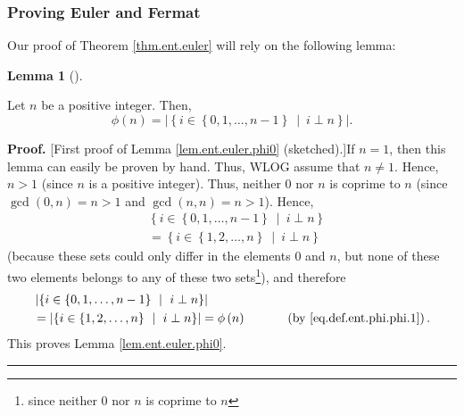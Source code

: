 \documentclass[numbers=enddot,12pt,final,onecolumn,notitlepage]{scrartcl}%
\numberwithin{exer}{subsection}
\theoremstyle{definition}
\newtheorem{lem}[theo]{Lemma}
\newenvironment{lemma}[1][]
{\begin{lem}[#1]\begin{leftbar}}
{\end{leftbar}\end{lem}}
\newenvironment{proof}[1][Proof]{\noindent\textbf{#1.} }{\ \rule{0.5em}{0.5em}}
\begin{document}
\subsubsection{Proving Euler and Fermat}

Our proof of Theorem \ref{thm.ent.euler} will rely on the following lemma:

\begin{lemma}
\label{lem.ent.euler.phi0}Let $n$ be a positive integer. Then,%
\[
\phi\left(  n\right)  =\left\vert \left\{  i\in\left\{  0,1,\ldots
,n-1\right\}  \ \mid\ i\perp n\right\}  \right\vert .
\]

\end{lemma}

\begin{proof}
[First proof of Lemma \ref{lem.ent.euler.phi0} (sketched).]If $n=1$, then this
lemma can easily be proven by hand. Thus, WLOG assume that $n \neq1$. Hence,
$n > 1$ (since $n$ is a positive integer). Thus, neither $0$ nor $n$ is
coprime to $n$ (since $\gcd\left(  0,n\right)  =n>1$ and $\gcd\left(
n,n\right)  =n>1$). Hence,%
\begin{align*}
&  \left\{  i\in\left\{  0,1,\ldots,n-1\right\}  \ \mid\ i\perp n\right\} \\
&  =\left\{  i\in\left\{  1,2,\ldots,n\right\}  \ \mid\ i\perp n\right\}
\end{align*}
(because these sets could only differ in the elements $0$ and $n$, but none of
these two elements belongs to any of these two sets\footnote{since neither $0$
nor $n$ is coprime to $n$}), and therefore%
\begin{align*}
&  \left\vert \left\{  i\in\left\{  0,1,\ldots,n-1\right\}  \ \mid\ i\perp
n\right\}  \right\vert \\
&  =\left\vert \left\{  i\in\left\{  1,2,\ldots,n\right\}  \ \mid\ i\perp
n\right\}  \right\vert =\phi\left(  n\right)  \ \ \ \ \ \ \ \ \ \ \left(
\text{by \eqref{eq.def.ent.phi.phi.1}} \right)  .
\end{align*}
This proves Lemma \ref{lem.ent.euler.phi0}.
\end{proof}
\end{document}
